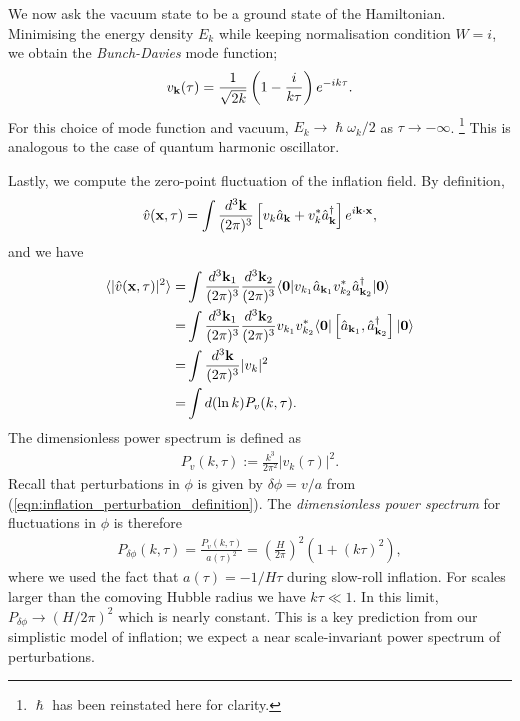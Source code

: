 We now ask the vacuum state to be a ground state of the Hamiltonian. Minimising the energy density $E_k$ while keeping normalisation condition $W=i$, we obtain the \textit{Bunch-Davies} mode function;
\begin{align}
	v_\mathbf{k}(\tau) = \frac{1}{\sqrt{2k}} \left( 1 - \frac{i}{k\tau} \right) e^{-ik\tau}. \label{eqn:bunch_davis_mode_function}
\end{align}
For this choice of mode function and vacuum, $E_k \rightarrow \hslash\omega_k/2$ as $\tau \rightarrow -\infty$. \footnote{$\hslash$ has been reinstated here for clarity.} This is analogous to the case of quantum harmonic oscillator.

Lastly, we compute the zero-point fluctuation of the inflation field. By definition,
\begin{align}
	\hat{v}(\mathbf{x}, \tau) = \int \frac{d^3\mathbf{k}}{(2\pi)^3} \left[ v_k \hat{a}_\mathbf{k} + v^*_k \hat{a}^\dagger_\mathbf{k} \right] e^{i\mathbf{k} \cdot \mathbf{x}},
\end{align}
and we have
\begin{align}
	\langle | \hat{v}(\mathbf{x}, \tau) |^2 \rangle =& \int \frac{d^3\mathbf{k}_1}{(2\pi)^3} \frac{d^3\mathbf{k}_2}{(2\pi)^3} \langle \mathbf{0} | v_{k_1} \hat{a}_{\mathbf{k}_1} v^*_{k_2} \hat{a}^\dagger_{\mathbf{k}_2} | \mathbf{0} \rangle 	\\
	=& \int \frac{d^3\mathbf{k}_1}{(2\pi)^3} \frac{d^3\mathbf{k}_2}{(2\pi)^3} v_{k_1} v^*_{k_2} \langle \mathbf{0} | \left[ \hat{a}_{\mathbf{k}_1}, \hat{a}^\dagger_{\mathbf{k}_2} \right] | \mathbf{0} \rangle	 \\
	=& \int \frac{d^3\mathbf{k}}{(2\pi)^3} |v_k|^2	\\
	=& \int d(\ln k) P_v (k,\tau).
\end{align}
The dimensionless power spectrum is defined as
\begin{align}
	P_v (k,\tau) := \frac{k^3}{2\pi^2} |v_k(\tau)|^2.
\end{align}
Recall that perturbations in $\phi$ is given by $\delta\phi = v/a$ from (\ref{eqn:inflation_perturbation_definition}). The \textit{dimensionless power spectrum} for fluctuations in $\phi$ is therefore
\begin{align}
	P_{\delta\phi} (k,\tau) = \frac{P_v (k,\tau)}{a(\tau)^2} = \left( \frac{H}{2\pi} \right)^2 \left(1 + (k\tau)^2 \right),
\end{align}
where we used the fact that $a(\tau) = -1/H\tau$ during slow-roll inflation. For scales larger than the comoving Hubble radius we have $k\tau \ll 1$. In this limit, $P_{\delta\phi} \rightarrow (H/2\pi)^2$ which is nearly constant. This is a key prediction from our simplistic model of inflation; we expect a near scale-invariant power spectrum of perturbations.